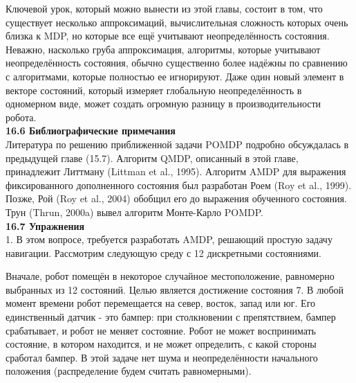 \documentclass[10pt,a4paper]{article}
\begin{document}
Ключевой урок, который можно вынести из этой главы, состоит в том, что существует несколько аппроксимаций, вычислительная сложность которых очень близка к MDP, но которые все ещё учитывают неопределённость состояния. Неважно, насколько груба аппроксимация, алгоритмы, которые учитывают неопределённость состояния, обычно существенно более надёжны по сравнению с алгоритмами, которые полностью ее игнорируют. Даже один новый элемент в векторе состояний, который измеряет глобальную неопределённость в одномерном виде, может создать огромную разницу в производительности робота.\\

\textbf{16.6	Библиографические примечания}\\

Литература по решению приближенной задачи POMDP подробно обсуждалась в предыдущей главе (15.7). Алгоритм QMDP, описанный в этой главе, принадлежит Литтману (Littman et al., 1995). Алгоритм AMDP для выражения фиксированного дополненного состояния был разработан Роем (Roy et al., 1999). Позже, Рой (Roy et al., 2004) обобщил его до выражения обученного состояния. Трун (Thrun, 2000a) вывел алгоритм Монте-Карло POMDP.\\

\textbf{16.7	Упражнения}\\

1.	В этом вопросе, требуется разработать AMDP, решающий простую задачу навигации. Рассмотрим следующую среду с 12 дискретными состояниями.

\begin{figure}[H]
	\label{fig:16sreda}
\end{figure}

Вначале, робот помещён в некоторое случайное местоположение, равномерно выбранных из 12 состояний. Целью является достижение состояния 7. В любой момент времени робот перемещается на север, восток, запад или юг. Его единственный датчик - это бампер: при столкновении с препятствием, бампер срабатывает, и робот не меняет состояние. Робот не может воспринимать состояние, в котором находится, и не может определить, с какой стороны сработал бампер. В этой задаче нет шума и неопределённости начального положения (распределение будем считать равномерными).\\
\end{document}
